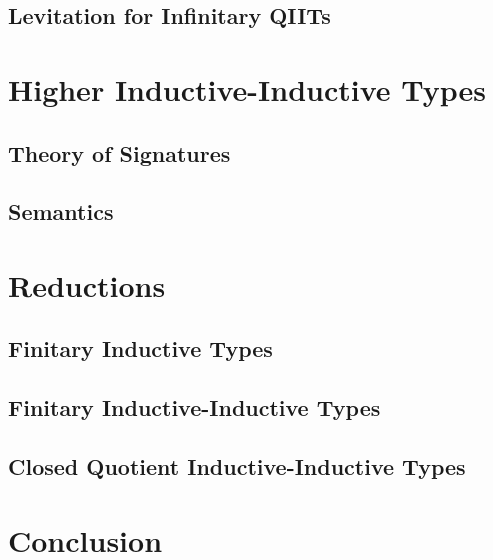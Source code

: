 \documentclass[12pt,a4paper,twoside,openany]{book}
\theoremstyle{remark}
\theoremstyle{definition}
\theoremstyle{theorem}
\begin{document}
\section{Levitation for Infinitary QIITs}

\chapter{Higher Inductive-Inductive Types}
\label{chap:hiit}

\section{Theory of Signatures}
\section{Semantics}

\chapter{Reductions}

\section{Finitary Inductive Types}
\section{Finitary Inductive-Inductive Types}
\section{Closed Quotient Inductive-Inductive Types}

\chapter{Conclusion}


\backmatter
\end{document}
